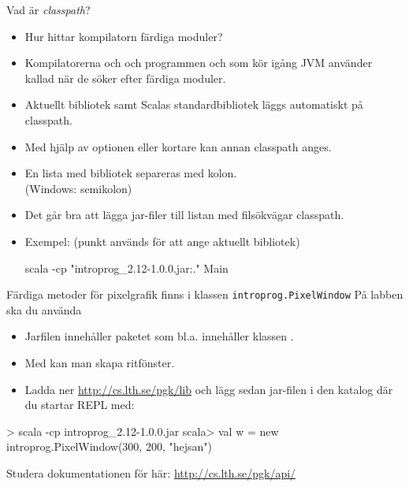 \begin{Slide}{Vad är \emph{classpath}?}\SlideFontSmall
\begin{itemize}
  \item Hur hittar kompilatorn färdiga moduler?
\pause
\item Kompilatorerna  och  och programmen  och  som kör igång JVM använder  kallad  när de söker efter färdiga moduler.
\pause
\item Aktuellt bibliotek samt Scalas standardbibliotek läggs automatiskt på classpath.
\item Med hjälp av optionen  eller kortare  kan annan classpath anges.
\item En lista med bibliotek separeras med kolon.\\(Windows: semikolon)
\item Det går bra att lägga jar-filer till listan med filsökvägar classpath.
\item Exempel: (punkt används för att ange aktuellt bibliotek)
\begin{REPLnonum}
scala -cp "introprog_2.12-1.0.0.jar:." Main
\end{REPLnonum}
\end{itemize}
\end{Slide}


\begin{Slide}{Färdiga metoder för pixelgrafik finns i klassen \texttt{introprog.PixelWindow}}
På labben ska du använda 
\begin{itemize}
\item Jarfilen  innehåller paketet  som bl.a. innehåller klassen .
\item Med  kan man skapa ritfönster.
\item Ladda ner \url{http://cs.lth.se/pgk/lib} och lägg sedan jar-filen i den katalog där du startar REPL med: 
\end{itemize}
\begin{REPLnonum}
> scala -cp introprog_2.12-1.0.0.jar
scala> val w = new introprog.PixelWindow(300, 200, "hejsan")
\end{REPLnonum}
Studera dokumentationen för  här: \url{http://cs.lth.se/pgk/api/}
\end{Slide}


